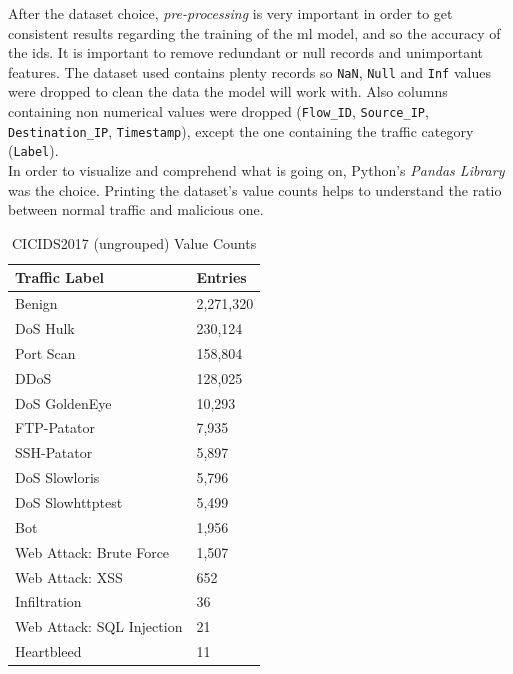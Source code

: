 After the dataset choice, \textit{pre-processing} is very important in order to get consistent results regarding the training of the \gls{ml} model, and so the accuracy of the \gls{ids}. It is important to remove redundant or null records and unimportant features. The dataset used contains plenty records so \texttt{NaN}, \texttt{Null} and \texttt{Inf} values were dropped to clean the data the model will work with. Also columns containing non numerical values were dropped (\texttt{Flow\_ID}, \texttt{Source\_IP}, \texttt{Destination\_IP}, \texttt{Timestamp}), except the one containing the traffic category (\texttt{Label}). \\ In order to visualize and comprehend what is going on, Python's \textit{Pandas Library} \cite{PandasLibrary} was the choice. Printing the dataset's value counts helps to understand the ratio between normal traffic and malicious one. 

\begin{table}[h]
    \centering
    \begin{tabular}{l|l}
        \toprule 
        Traffic Label & Entries \\
        \midrule
        \rowcolor{black!10} Benign & 2,271,320 \\
        DoS Hulk & 230,124 \\
        \rowcolor{black!10} Port Scan & 158,804 \\
        DDoS & 128,025 \\
        \rowcolor{black!10} DoS GoldenEye & 10,293 \\
        FTP-Patator & 7,935 \\
        \rowcolor{black!10} SSH-Patator & 5,897 \\
        DoS Slowloris & 5,796 \\
        \rowcolor{black!10} DoS Slowhttptest & 5,499 \\
        Bot & 1,956 \\
        \rowcolor{black!10} Web Attack: Brute Force & 1,507 \\
        Web Attack: XSS & 652 \\
        \rowcolor{black!10} Infiltration & 36 \\
        Web Attack: SQL Injection & 21 \\
        \rowcolor{black!10} Heartbleed & 11 \\
        \bottomrule
    \end{tabular}
    \caption{CICIDS2017 (ungrouped) Value Counts}
    \label{tab:dataset-distribution}
\end{table}

